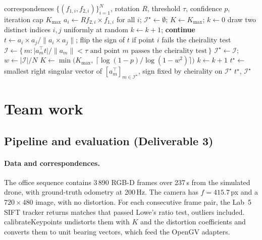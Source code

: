 \documentclass[11pt,a4paper]{article}
\DeclareRobustCommand{\code}[1]{\begingroup\ttfamily\codebreaks#1\endgroup}
\newcommand{\codebreaks}{\renewcommand{\_}{\textunderscore\allowbreak}}
\begin{document}
\begin{algorithm}[H]
  \caption{RANSAC for the translation direction with known rotation}
  \label{alg:ransac2pt}
  \small
  \begin{algorithmic}[1]
    \Require correspondences $\{(f_{1,i}, f_{2,i})\}_{i=1}^{N}$, rotation $R$,
      threshold $\tau$, confidence $p$, iteration cap $K_{\max}$
    \State $a_i \gets R f_{2,i} \times f_{1,i}$ for all $i$; \quad
      $\mathcal{I}^\star \gets \emptyset$; \quad $K \gets K_{\max}$; \quad $k \gets 0$
      \State draw two distinct indices $i, j$ uniformly at random
       \State $k \gets k+1$; \textbf{continue}  \EndIf
      \State $t \gets a_i \times a_j / \lVert a_i \times a_j \rVert$; flip the sign of $t$ if point $i$ fails the cheirality test
      \State $\mathcal{I} \gets \{\, m : \lvert a_m^\top t\rvert / \lVert a_m\rVert < \tau
        \text{ and point } m \text{ passes the cheirality test} \,\}$
        \State $\mathcal{I}^\star \gets \mathcal{I}$; \quad $w \gets \lvert\mathcal{I}\rvert / N$
        \State $K \gets \min\bigl(K_{\max},\ \lceil \log(1-p) / \log(1-w^2) \rceil\bigr)$ 
      \EndIf
      \State $k \gets k + 1$
    \EndWhile
    \State $t^\star \gets$ smallest right singular vector of $[a_m^\top]_{m\in\mathcal{I}^\star}$, sign fixed by cheirality on $\mathcal{I}^\star$
    \State \Return $t^\star$, $\mathcal{I}^\star$
  \end{algorithmic}
\end{algorithm}

\section{Team work}\label{sec:team}

\subsection{Pipeline and evaluation (Deliverable 3)}\label{sec:impl}

\paragraph{Data and correspondences.}
The office sequence contains 3\,890 RGB-D frames over 237\,s from the simulated
drone, with ground-truth odometry at 200\,Hz. The camera has $f = 415.7$\,px and a
$720\times 480$ image, with no distortion. For each consecutive frame pair, the Lab~5
SIFT tracker returns matches that passed Lowe's ratio test, outliers included.
\code{calibrateKeypoints} undistorts them with $K$ and the distortion coefficients and
converts them to unit bearing vectors, which feed the OpenGV adapters.
\end{document}
